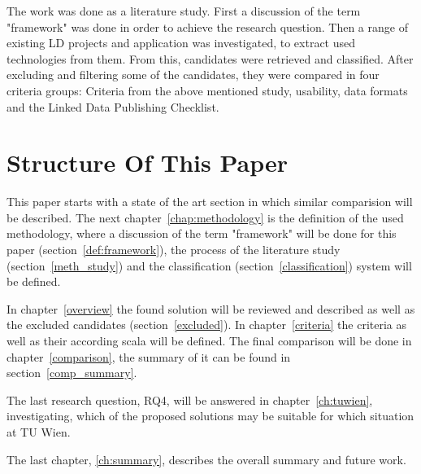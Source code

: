 The work was done as a literature study. First a discussion of the term "framework" was done in order to achieve the research question. Then a range of existing LD projects and application was investigated, to extract used technologies from them. From this, candidates were retrieved and classified. After excluding and filtering some of the candidates, they were compared in four criteria groups: Criteria from the above mentioned study, usability, data formats and the Linked Data Publishing Checklist.

\section{Structure Of This Paper}
This paper starts with a state of the art section in which similar comparision will be described. The next chapter~\ref{chap:methodology} is the definition of the used methodology, where a discussion of the term "framework" will be done for this paper (section~\ref{def:framework}), the process of the literature study (section~\ref{meth_study}) and the classification (section~\ref{classification}) system will be defined.

In chapter~\ref{overview} the found solution will be reviewed and described as well as the excluded candidates (section~\ref{excluded}). In chapter~\ref{criteria} the criteria as well as their according scala will be defined. The final comparison will be done in chapter~\ref{comparison}, the summary of it can be found in section~\ref{comp_summary}.

The last research question, RQ4, will be answered in chapter~\ref{ch:tuwien}, investigating, which of the proposed solutions may be suitable for which situation at TU Wien.

The last chapter, \ref{ch:summary}, describes the overall summary and future work.